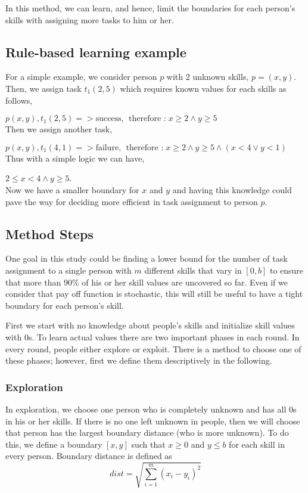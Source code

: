 \documentclass[]{article}
\begin{document}
In this method, we can learn, and hence, limit the boundaries for each person's skills with assigning more tasks to him or her.

\subsection{Rule-based learning example}
For a simple example, we consider person $p$ with 2 unknown skills, $p=(x, y)$. Then, we assign task $t_1(2, 5)$ which requires known values for each skills as follows,

$p(x,y), t_1(2, 5) => \text{success, }\;\text{therefore :}\; x\geq 2 \wedge y\geq 5$\\
Then we assign another task,

$p(x,y), t_1(4, 1) => \text{failure, }\;\text{therefore :}\; x\geq 2 \wedge y\geq 5 \wedge (x<4 \vee y<1)$\\
Thus with a simple logic we can have,

$2\leq x < 4 \wedge y\geq 5$.\\
Now we have a smaller boundary for $x$ and $y$ and having this knowledge could pave the way for deciding more efficient in task assignment to person $p$.

\subsection{Method Steps}
One goal in this study could be finding a lower bound for the number of task assignment to a single person with $m$ different skills that vary in $[0, b]$ to ensure that more than 90\% of his or her skill values are uncovered so far. Even if we consider that pay off function is stochastic, this will still be useful to have a tight boundary for each person's skill.

First we start with no knowledge about people's skills and initialize skill values with 0s. To learn actual values there are two important phases in each round. In every round, people either explore or exploit. There is a method to choose one of these phases; however, first we define them descriptively in the following.

\subsubsection{Exploration}
In exploration, we choose one person who is completely unknown and has all 0s in his or her skills. If there is no one left unknown in people, then we will choose that person has the largest boundary distance (who is more unknown). To do this, we define a boundary $[x,y]$ such that $x\geq 0$ and $y\leq b$ for each skill in every person. Boundary distance is defined as
\begin{equation}
	dist = \sqrt{\sum_{i=1}^{m}(x_i-y_i)^2}
\end{equation}
\end{document}
